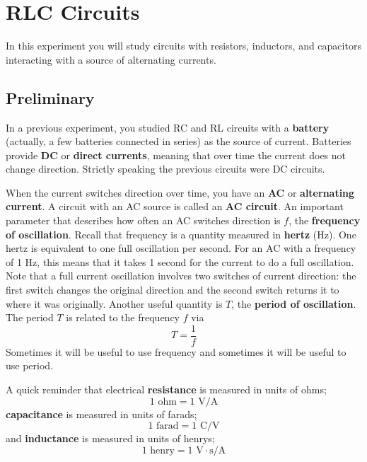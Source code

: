 \setcounter{chapter}{5}
\chapter{RLC Circuits}
%
In this experiment you will study circuits with resistors, inductors, and capacitors interacting with a source of alternating currents.
%
\section{Preliminary}
%
In a previous experiment, you studied RC and RL circuits with a \textbf{battery} (actually, a few batteries connected in series) as the source of current. Batteries provide \textbf{DC} or \textbf{direct currents}, meaning that over time the current does not change direction. Strictly speaking the previous circuits were DC circuits.

When the current switches direction over time, you have an \textbf{AC} or \textbf{alternating current}. A circuit with an AC source is called an \textbf{AC circuit}. An important parameter that describes how often an AC switches direction is $f$, the \textbf{frequency of oscillation}. Recall that frequency is a quantity measured in \textbf{hertz} (Hz). One hertz is equivalent to one full oscillation per second. For an AC with a frequency of 1 Hz, this means that it takes 1 second for the current to do a full oscillation. Note that a full current oscillation involves two switches of current direction: the first switch changes the original direction and the second switch returns it to where it was originally. Another useful quantity is $T$, the \textbf{period of oscillation}. The period $T$ is related to the frequency $f$ via
\begin{equation} \label{eq.06.period}
	T = \frac{1}{f}
\end{equation}
Sometimes it will be useful to use frequency and sometimes it will be useful to use period.

A quick reminder that electrical \textbf{resistance} is measured in units of ohms;
\begin{equation}
	1 \text{ ohm} = 1 \text{ V/A}
\end{equation}
\textbf{capacitance} is measured in units of farads;
\begin{equation}
	1 \text{ farad} = 1 \text{ C/V}
\end{equation}
and \textbf{inductance} is measured in units of henrys;
\begin{equation}
	1 \text{ henry} = 1 \text{ V}\cdot\text{s/A}
\end{equation}
%
